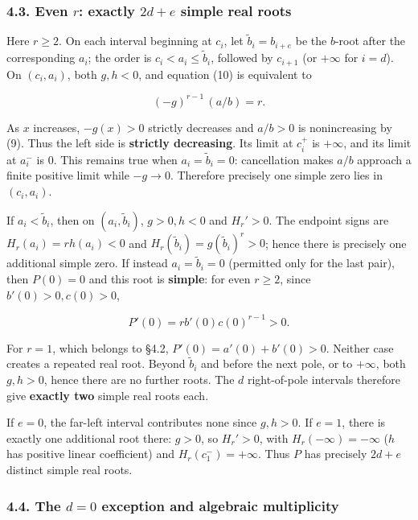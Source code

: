 \documentclass[
  10pt,
]{article}
\begin{document}
\subsubsection{\texorpdfstring{4.3. Even \(r\): exactly \(2d+e\) simple
real
roots}{4.3. Even r: exactly 2d+e simple real roots}}\label{even-r-exactly-2de-simple-real-roots}

Here \(r\ge2\). On each interval beginning at \(c_i\), let
\(\tilde b_i=b_{i+e}\) be the \(b\)-root after the corresponding
\(a_i\); the order is \(c_i<a_i\le\tilde b_i\), followed by \(c_{i+1}\)
(or \(+\infty\) for \(i=d\)). On \((c_i,a_i)\), both \(g,h<0\), and
equation (10) is equivalent to

\[
 (-g)^{r-1}\,(a/b)=r. \tag{11}
\]

As \(x\) increases, \(-g(x)>0\) strictly decreases and \(a/b>0\) is
nonincreasing by (9). Thus the left side is \textbf{strictly
decreasing}. Its limit at \(c_i^+\) is \(+\infty\), and its limit at
\(a_i^-\) is \(0\). This remains true when \(a_i=\tilde b_i=0\):
cancellation makes \(a/b\) approach a finite positive limit while
\(-g\to0\). Therefore precisely one simple zero lies in \((c_i,a_i)\).

If \(a_i<\tilde b_i\), then on \((a_i,\tilde b_i)\), \(g>0,h<0\) and
\(H_r'>0\). The endpoint signs are \(H_r(a_i)=r h(a_i)<0\) and
\(H_r(\tilde b_i)=g(\tilde b_i)^r>0\); hence there is precisely one
additional simple zero. If instead \(a_i=\tilde b_i=0\) (permitted only
for the last pair), then \(P(0)=0\) and this root is \textbf{simple}:
for even \(r\ge2\), since \(b'(0)>0,c(0)>0\),

\[
 P'(0)=r b'(0)c(0)^{r-1}>0.
\]

For \(r=1\), which belongs to §4.2, \(P'(0)=a'(0)+b'(0)>0\). Neither
case creates a repeated real root. Beyond \(\tilde b_i\) and before the
next pole, or to \(+\infty\), both \(g,h>0\), hence there are no further
roots. The \(d\) right-of-pole intervals therefore give \textbf{exactly
two} simple real roots each.

If \(e=0\), the far-left interval contributes none since \(g,h>0\). If
\(e=1\), there is exactly one additional root there: \(g>0\), so
\(H_r'>0\), with \(H_r(-\infty)=-\infty\) (\(h\) has positive linear
coefficient) and \(H_r(c_1^-)=+\infty\). Thus \(P\) has precisely
\(2d+e\) distinct simple real roots.

\subsubsection{\texorpdfstring{4.4. The \(d=0\) exception and algebraic
multiplicity}{4.4. The d=0 exception and algebraic multiplicity}}\label{the-d0-exception-and-algebraic-multiplicity}
\end{document}
